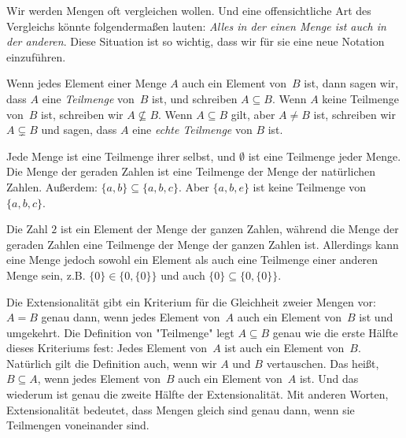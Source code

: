 \documentclass[../../../include/open-logic-section]{subfiles}
\begin{document}

\begin{explain}
Wir werden Mengen oft vergleichen wollen. Und eine offensichtliche Art des Vergleichs
könnte folgendermaßen lauten: \emph{Alles in der einen Menge ist auch in der anderen}.
Diese Situation ist so wichtig, dass wir für sie
eine neue Notation einzuführen.
\end{explain}

\begin{defn}[Teilmenge]
Wenn jedes Element einer Menge $A$ auch ein Element von~$B$ ist, dann sagen wir,
dass $A$ eine \emph{Teilmenge} von~$B$ ist, und schreiben $A \subseteq B$. Wenn
$A$ keine Teilmenge von~$B$ ist, schreiben wir $A \not\subseteq B$.
Wenn $A \subseteq B$ gilt, aber $A \neq B$ ist, schreiben wir $A \subsetneq B$ und sagen,
dass $A$ eine \emph{echte Teilmenge} von $B$ ist.
\end{defn}

\begin{ex}
Jede Menge ist eine Teilmenge ihrer selbst, und $\emptyset$ ist eine Teilmenge jeder
Menge. Die Menge der geraden Zahlen ist eine Teilmenge der Menge der natürlichen
Zahlen. Außerdem: $\{ a, b \} \subseteq \{ a, b, c \}$. Aber $\{ a, b, e
\}$ ist keine Teilmenge von $\{ a, b, c \}$.
\end{ex}

\begin{ex}
Die Zahl $2$ ist ein Element der Menge der ganzen Zahlen, während die
Menge der geraden Zahlen eine Teilmenge der Menge der ganzen Zahlen ist. Allerdings kann eine 
Menge jedoch sowohl ein Element als auch eine Teilmenge einer anderen Menge sein, z.B. $\{0\} \in \{0, \{0\}\}$ und auch $\{0\} \subseteq \{0,
\{0\}\}$.
\end{ex}

Die Extensionalität gibt ein Kriterium für die Gleichheit zweier Mengen 
vor: $A = B$ genau dann, wenn
jedes Element von~$A$ auch ein Element von~$B$ ist und umgekehrt.
Die Definition von "Teilmenge" legt $A \subseteq B$ genau wie die
erste Hälfte dieses Kriteriums fest: Jedes Element von~$A$ ist auch
ein Element von~$B$. Natürlich gilt die Definition auch, wenn wir
$A$ und $B$ vertauschen. Das heißt, $B \subseteq A$, wenn jedes Element
von~$B$ auch ein Element von~$A$ ist. Und das wiederum ist genau die zweite Hälfte
der Extensionalität. Mit anderen Worten, Extensionalität
bedeutet, dass Mengen gleich sind genau dann, wenn sie Teilmengen voneinander sind.
\end{document}
